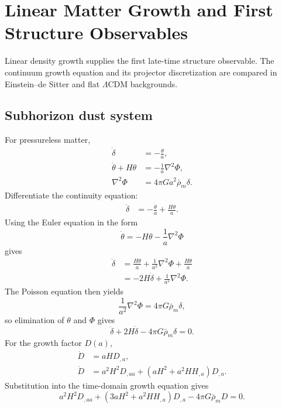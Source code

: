 \chapter{Linear Matter Growth and First Structure Observables}

Linear density growth supplies the first late-time structure observable.  The continuum growth equation and its projector discretization are compared in Einstein--de Sitter and flat \(\Lambda\)CDM backgrounds.

\allowdisplaybreaks

\section{Subhorizon dust system}
For pressureless matter,
\begin{align}
\dot\delta&=-\frac{\theta}{a},\\
\dot\theta+H\theta&=-\frac{1}{a}\nabla^2\Phi,\\
\nabla^2\Phi&=4\pi Ga^2\bar\rho_m\delta.
\end{align}
Differentiate the continuity equation:
\begin{align}
\ddot\delta
&=-\frac{\dot\theta}{a}
+\frac{H\theta}{a}.
\end{align}
Using the Euler equation in the form
\begin{equation}
\dot\theta=-H\theta-\frac1a\nabla^2\Phi
\end{equation}
gives
\begin{align}
\ddot\delta
&=\frac{H\theta}{a}
+\frac{1}{a^2}\nabla^2\Phi
+\frac{H\theta}{a}\\
&=-2H\dot\delta
+\frac{1}{a^2}\nabla^2\Phi.
\end{align}
The Poisson equation then yields
\begin{equation}
\frac{1}{a^2}\nabla^2\Phi
=4\pi G\bar\rho_m\delta,
\end{equation}
so elimination of \(\theta\) and \(\Phi\) gives
\begin{equation}
\boxed{
\ddot\delta+2H\dot\delta-4\pi G\bar\rho_m\delta=0.
}
\end{equation}
For the growth factor \(D(a)\),
\begin{align}
\dot D&=aH D_{,a},\\
\ddot D
&=a^2H^2D_{,aa}
+\left(aH^2+a^2HH_{,a}\right)D_{,a}.
\end{align}
Substitution into the time-domain growth equation gives
\begin{equation}
a^2H^2D_{,aa}
+\left(3aH^2+a^2HH_{,a}\right)D_{,a}
-4\pi G\bar\rho_mD=0.
\end{equation}
